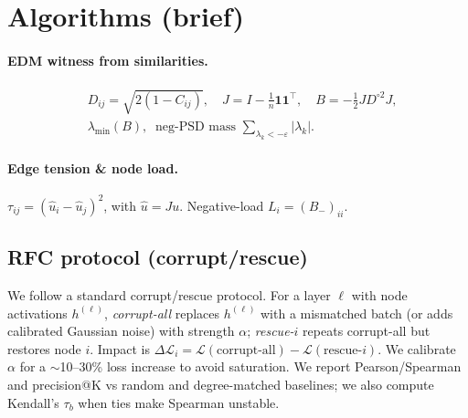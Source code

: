\documentclass[11pt]{article}
\newcommand{\1}{\mathbf{1}}
\begin{document}
\section{Algorithms (brief)}
\paragraph{EDM witness from similarities.}
\begin{align*}
& D_{ij}=\sqrt{2(1-C_{ij})},\quad J=I-\tfrac1n \1\1^\top,\quad B=-\tfrac12 J D^{\circ2} J,\\
& \lambda_{\min}(B),\;\; \text{neg-PSD mass } \sum_{\lambda_k<-\varepsilon}|\lambda_k|.
\end{align*}
\paragraph{Edge tension \& node load.}
$\tau_{ij}=(\hat u_i-\hat u_j)^2$, with $\hat u=Ju$. Negative-load $L_i=(B_-)_{ii}$.

\subsection*{RFC protocol (corrupt/rescue)}\label{app:rfc-protocol}
We follow a standard corrupt/rescue protocol. For a layer $\ell$ with node activations $h^{(\ell)}$, \emph{corrupt-all} replaces $h^{(\ell)}$ with a mismatched batch (or adds calibrated Gaussian noise) with strength $\alpha$; \emph{rescue-$i$} repeats corrupt-all but restores node $i$. Impact is $\Delta\mathcal{L}_i=\mathcal{L}(\text{corrupt-all})-\mathcal{L}(\text{rescue-}i)$. We calibrate $\alpha$ for a $\sim$10--30\% loss increase to avoid saturation. We report Pearson/Spearman and precision@K vs random and degree-matched baselines; we also compute Kendall's $\tau_b$ when ties make Spearman unstable.
\end{document}
